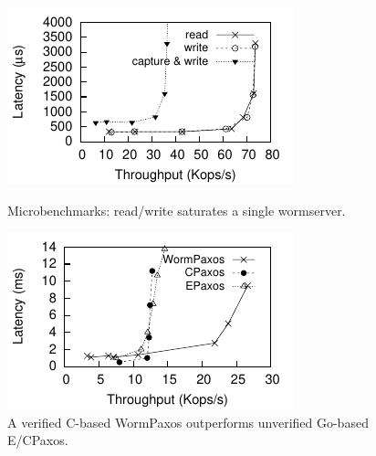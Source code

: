 \begin{figure}
\begin{minipage}[t]{0.32\textwidth}
\vspace{0pt}
\includegraphics{graphs/veri_wormspace_micro}
\caption{Microbenchmarks: read/write saturates a single wormserver.\label{fig:micro}}
\end{minipage}
\hspace{0.1in}
\begin{minipage}[t]{0.32\textwidth}
\vspace{0pt}
\includegraphics{graphs/veri_wormspace_paxos}
\caption{A verified C-based WormPaxos outperforms unverified Go-based E/CPaxos.\label{fig:paxos}}
\end{minipage}
\hspace{0.1in}
\begin{minipage}[t]{0.32\textwidth}
\vspace{0pt}

\end{minipage}
\end{figure}
